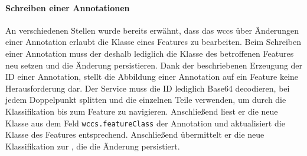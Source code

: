     \paragraph*{Schreiben einer Annotationen}
    An verschiedenen Stellen wurde bereits erwähnt,
    dass das \gls{wccs} über Änderungen einer Annotation erlaubt die Klasse eines Features zu bearbeiten.
    Beim Schreiben einer Annotation muss der {\annotationService} deshalb lediglich
    die Klasse des betroffenen Features neu setzen und die Änderung persistieren.
    Dank der beschriebenen Erzeugung der ID einer Annotation,
    stellt die Abbildung einer Annotation auf ein Feature keine Herausforderung dar.
    Der Service muss die ID lediglich Base64 decodieren,
    bei jedem Doppelpunkt splitten und die einzelnen Teile verwenden,
    um durch die Klassifikation bis zum Feature zu navigieren.
    Anschließend liest er die neue Klasse aus dem Feld \texttt{wccs.featureClass} der Annotation
    und aktualisiert die Klasse des Features entsprechend.
    Anschließend übermittelt er die neue Klassifikation zur {\classificationStorageAPI},
    die die Änderung persistiert.
